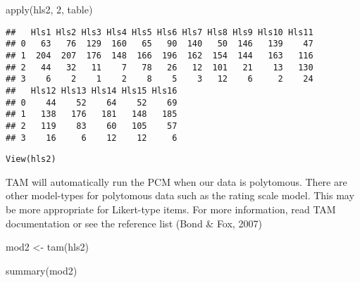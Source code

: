 \documentclass[
]{book}
\newenvironment{Shaded}{\begin{snugshade}}{\end{snugshade}}
\newcommand{\DecValTok}[1]{\textcolor[rgb]{0.00,0.00,0.81}{#1}}
\newcommand{\FunctionTok}[1]{\textcolor[rgb]{0.00,0.00,0.00}{#1}}
\newcommand{\NormalTok}[1]{#1}
\newcommand{\OtherTok}[1]{\textcolor[rgb]{0.56,0.35,0.01}{#1}}
\begin{document}
\begin{Shaded}
\begin{Highlighting}[]
\FunctionTok{apply}\NormalTok{(hls2, }\DecValTok{2}\NormalTok{, table)}
\end{Highlighting}
\end{Shaded}

\begin{verbatim}
##   Hls1 Hls2 Hls3 Hls4 Hls5 Hls6 Hls7 Hls8 Hls9 Hls10 Hls11
## 0   63   76  129  160   65   90  140   50  146   139    47
## 1  204  207  176  148  166  196  162  154  144   163   116
## 2   44   32   11    7   78   26   12  101   21    13   130
## 3    6    2    1    2    8    5    3   12    6     2    24
##   Hls12 Hls13 Hls14 Hls15 Hls16
## 0    44    52    64    52    69
## 1   138   176   181   148   185
## 2   119    83    60   105    57
## 3    16     6    12    12     6
\end{verbatim}

\begin{verbatim}
View(hls2)
\end{verbatim}

TAM will automatically run the PCM when our data is polytomous. There are other model-types for polytomous data such as the rating scale model. This may be more appropriate for Likert-type items. For more information, read TAM documentation or see the reference list (Bond \& Fox, 2007)

\begin{Shaded}
\begin{Highlighting}[]
\NormalTok{mod2 }\OtherTok{\textless{}{-}} \FunctionTok{tam}\NormalTok{(hls2)}
\end{Highlighting}
\end{Shaded}

\begin{Shaded}
\begin{Highlighting}[]
\FunctionTok{summary}\NormalTok{(mod2)}
\end{Highlighting}
\end{Shaded}
\end{document}
